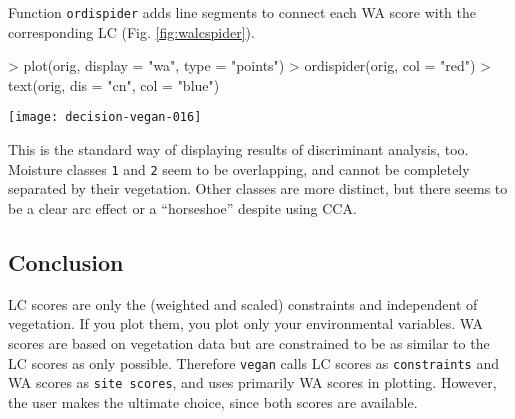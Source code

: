 \documentclass[a4paper,10pt]{amsart}
\begin{document}
Function \texttt{ordispider} adds line segments to connect each WA
score with the corresponding LC (Fig.  \ref{fig:walcspider}).
\begin{Schunk}
\begin{Sinput}
> plot(orig, display = "wa", type = "points")
> ordispider(orig, col = "red")
> text(orig, dis = "cn", col = "blue")
\end{Sinput}
\end{Schunk}
\begin{SCfigure}
\texttt{[image: decision-vegan-016]}
\caption{A ``spider plot'' connecting WA scores to corresponding LC
  scores. The shorter the web segments, the better the ordination.}
\label{fig:walcspider}
\end{SCfigure}
This is the standard way of displaying results of discriminant
analysis, too.  Moisture classes \texttt{1} and \texttt{2} seem to be
overlapping, and cannot be completely separated by their
vegetation. Other classes are more distinct, but there seems to be a
clear arc effect or a ``horseshoe'' despite using CCA.

\subsection{Conclusion}

LC scores are only the (weighted and scaled) constraints and
independent of vegetation. If you plot them, you plot only your
environmental variables. WA scores are based on vegetation data but
are constrained to be as similar to the LC scores as only
possible. Therefore \texttt{vegan} calls LC scores as
\texttt{constraints} and WA scores as \texttt{site scores}, and uses
primarily WA scores in plotting.  However, the user makes the ultimate
choice, since both scores are available.




\end{document}
